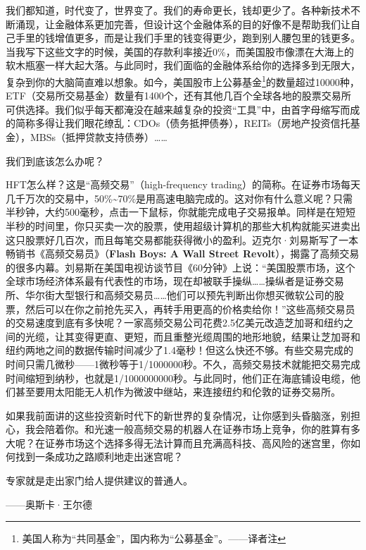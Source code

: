 我们都知道，时代变了，世界变了。我们的寿命更长，钱却更少了。各种新技术不断涌现，让金融体系更加完善，但设计这个金融体系的目的好像不是帮助我们让自己手里的钱增值更多，而是让我们手里的钱变得更少，跑到别人腰包里的钱更多。当我写下这些文字的时候，美国的存款利率接近0\%，而美国股市像漂在大海上的软木瓶塞一样大起大落。与此同时，我们面临的金融体系给你的选择多到无限大，复杂到你的大脑简直难以想象。如今，美国股市上公募基金\footnote{\label{fn:pdf-1-1}美国人称为“共同基金”，国内称为“公募基金”。——译者注}的数量超过10000种，ETF（交易所交易基金）数量有1400个，还有其他几百个全球各地的股票交易所可供选择。我们似乎每天都淹没在越来越复杂的投资“工具”中，由首字母缩写而成的简称多得让我们眼花缭乱：CDOs（债务抵押债券），REITs（房地产投资信托基金），MBSs（抵押贷款支持债券）……

我们到底该怎么办呢？

HFT怎么样？这是“高频交易”（high-frequency trading）的简称。在证券市场每天几千万次的交易中，50\%\textasciitilde{}70\%是用高速电脑完成的。这对你有什么意义呢？只需半秒钟，大约500毫秒，点击一下鼠标，你就能完成电子交易报单。同样是在短短半秒的时间里，你只买卖一次的股票，使用超级计算机的那些大机构就能买进卖出这只股票好几百次，而且每笔交易都能获得微小的盈利。迈克尔·刘易斯写了一本畅销书《高频交易员》（\textbf{Flash Boys: A Wall Street Revolt}），揭露了高频交易的很多内幕。刘易斯在美国电视访谈节目《60分钟》上说：“美国股票市场，这个全球市场经济体系最有代表性的市场，现在却被联手操纵……操纵者是证券交易所、华尔街大型银行和高频交易员……他们可以预先判断出你想买微软公司的股票，然后可以在你之前抢先买入，再转手用更高的价格卖给你！”这些高频交易员的交易速度到底有多快呢？一家高频交易公司花费2.5亿美元改造芝加哥和纽约之间的光缆，让其变得更直、更短，而且重整光缆周围的地形地貌，结果让芝加哥和纽约两地之间的数据传输时间减少了1.4毫秒！但这么快还不够。有些交易完成的时间只需几微秒——1微秒等于1/1000000秒。不久，高频交易技术就能把交易完成时间缩短到纳秒，也就是1/1000000000秒。与此同时，他们正在海底铺设电缆，他们甚至要用太阳能无人机作为微波中继站，来连接纽约和伦敦的证券交易所。

如果我前面讲的这些投资新时代下的新世界的复杂情况，让你感到头昏脑涨，别担心，我会陪着你。和光速一般高频交易的机器人在证券市场上竞争，你的胜算有多大呢？在证券市场这个选择多得无法计算而且充满高科技、高风险的迷宫里，你如何找到一条成功之路顺利地走出迷宫呢？

\begin{BookQuote}
专家就是走出家门给人提供建议的普通人。

\hfill ——奥斯卡·王尔德
\end{BookQuote}

